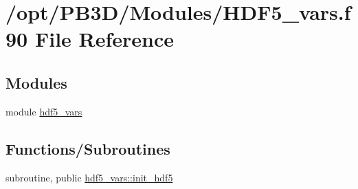 \hypertarget{HDF5__vars_8f90}{}\section{/opt/\+P\+B3\+D/\+Modules/\+H\+D\+F5\+\_\+vars.f90 File Reference}
\label{HDF5__vars_8f90}
\subsection*{Modules}
\begin{DoxyCompactItemize}
\item 
module \hyperlink{namespacehdf5__vars}{hdf5\+\_\+vars}
\end{DoxyCompactItemize}
\subsection*{Functions/\+Subroutines}
\begin{DoxyCompactItemize}
\item 
subroutine, public \hyperlink{namespacehdf5__vars_ab644703bcb67ce423732e39ab56a4b63}{hdf5\+\_\+vars\+::init\+\_\+hdf5}
\end{DoxyCompactItemize}

